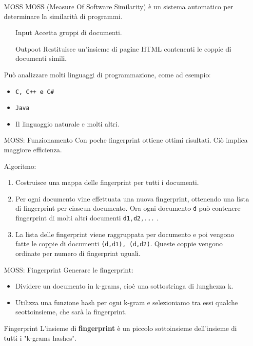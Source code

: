 \documentclass{beamer}
\begin{document}
	\begin{frame}{MOSS}
		MOSS (Measure Of Software Similarity) è un sistema automatico per determinare la similarità di programmi.
		
		\begin{itemize}
			\item[Input] Accetta gruppi di documenti.
			\item[Outpoot] Restituisce un'insieme di pagine HTML contenenti le coppie di documenti simili.
		\end{itemize}
		
		\pause
		Può analizzare molti linguaggi di programmazione, come ad esempio:
		\begin{itemize}
			\item \texttt{C, C++ e C\#}
			\item \texttt{Java}
			\item Il linguaggio naturale e molti altri.
		\end{itemize}
	\end{frame}

	\begin{frame}{MOSS: Funzionamento}
		Con poche fingerprint ottiene ottimi risultati. Ciò implica maggiore efficienza.
		
		Algoritmo:
		\begin{enumerate}[<+->]
			\item Costruisce una mappa delle fingerprint per tutti i documenti.
			\item Per ogni documento vine effettuata una nuova fingerprint, ottenendo una lista di fingerprint per ciascun documento. Ora ogni documento \texttt{d} può contenere fingerprint di molti altri documenti \texttt{d1,d2,...} .
			\item La lista delle fingerprint viene raggruppata per documento e poi vengono fatte le coppie di documenti \texttt{(d,d1), (d,d2)}.
			Queste coppie vengono ordinate per numero di fingerprint uguali.
			
		\end{enumerate}
	\end{frame}
	
	\begin{frame}{MOSS: Fingerprint}
		Generare le fingerprint:
		\begin{itemize}[<+->]
			\item Dividere un documento in k-grams, cioè una sottostringa di lunghezza k.
			\item Utilizza una funzione hash per ogni k-gram e selezioniamo tra essi qualche seottoinsieme, che sarà la fingerprint.
		\end{itemize}
		\pause
		\begin{alertblock}{Fingerprint}
			L'insieme di \textbf{fingerprint} è un piccolo sottoinsieme dell'insieme di tutti i "k-grams hashes".
		\end{alertblock}
	\end{frame}
\end{document}
